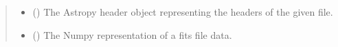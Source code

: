 \documentclass[letterpaper,10pt,english]{sphinxmanual}
\begin{document}
\begin{fulllineitems}
\begin{quote}
\begin{description}
\begin{itemize}
\item {} 
 () \textendash{} The Astropy header object representing the headers of the given file.

\item {} 
 () \textendash{} The Numpy representation of a fits file data.

\end{itemize}


\end{description}\end{quote}

\end{fulllineitems}

\end{document}
